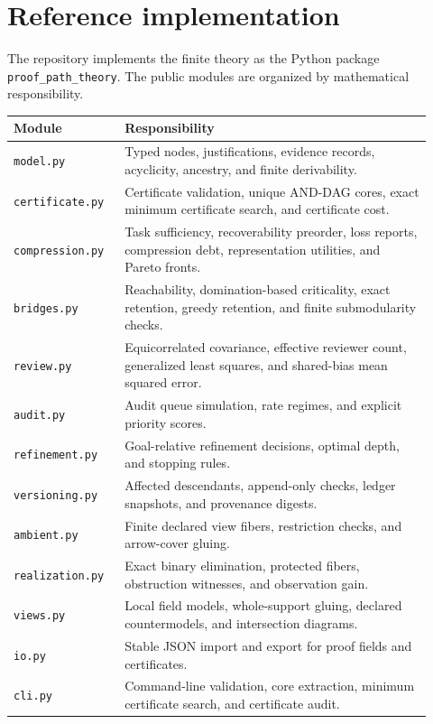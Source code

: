 \documentclass[11pt,oneside]{article}
\theoremstyle{komorebiplain}
\theoremstyle{komorebidefinition}
\theoremstyle{komorebiremark}
\begin{document}
\section{Reference implementation}
\label{sec:old21}

The repository implements the finite theory as the Python package \texttt{proof\_path\_theory}. The public modules are organized by mathematical responsibility.

\begin{longtable}{@{}p{0.24\linewidth}p{0.68\linewidth}@{}}
\toprule
Module & Responsibility\\
\midrule
\endhead
\texttt{model.py} & Typed nodes, justifications, evidence records, acyclicity, ancestry, and finite derivability.\\
\texttt{certificate.py} & Certificate validation, unique AND-DAG cores, exact minimum certificate search, and certificate cost.\\
\texttt{compression.py} & Task sufficiency, recoverability preorder, loss reports, compression debt, representation utilities, and Pareto fronts.\\
\texttt{bridges.py} & Reachability, domination-based criticality, exact retention, greedy retention, and finite submodularity checks.\\
\texttt{review.py} & Equicorrelated covariance, effective reviewer count, generalized least squares, and shared-bias mean squared error.\\
\texttt{audit.py} & Audit queue simulation, rate regimes, and explicit priority scores.\\
\texttt{refinement.py} & Goal-relative refinement decisions, optimal depth, and stopping rules.\\
\texttt{versioning.py} & Affected descendants, append-only checks, ledger snapshots, and provenance digests.\\
\texttt{ambient.py} & Finite declared view fibers, restriction checks, and arrow-cover gluing.\\
\texttt{realization.py} & Exact binary elimination, protected fibers, obstruction witnesses, and observation gain.\\
\texttt{views.py} & Local field models, whole-support gluing, declared countermodels, and intersection diagrams.\\
\texttt{io.py} & Stable JSON import and export for proof fields and certificates.\\
\texttt{cli.py} & Command-line validation, core extraction, minimum certificate search, and certificate audit.\\
\bottomrule
\end{longtable}
\end{document}
